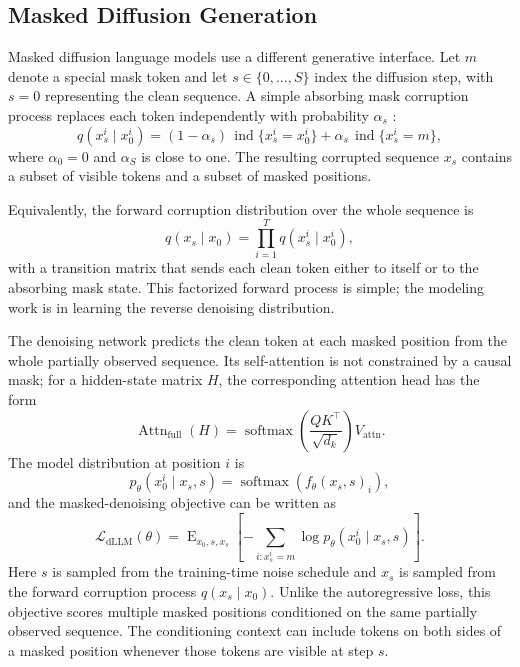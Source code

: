 \subsection{Masked Diffusion Generation}
Masked diffusion language models use a different generative interface. Let
$m$ denote a special mask token and let $s\in\{0,\ldots,S\}$ index the
diffusion step, with $s=0$ representing the clean sequence. A simple absorbing
mask corruption process replaces each token independently with probability
$\alpha_s$ \cite{austin2021structured,nie2025llada}:
\begin{equation}
    q(x_s^i \mid x_0^i)
    =
    (1-\alpha_s)\,\operatorname{ind}\{x_s^i=x_0^i\}
    +
    \alpha_s\,\operatorname{ind}\{x_s^i=m\},
\end{equation}
where $\alpha_0=0$ and $\alpha_S$ is close to one. The resulting corrupted
sequence $x_s$ contains a subset of visible tokens and a subset of masked
positions.

Equivalently, the forward corruption distribution over the whole sequence is
\begin{equation}
    q(x_s\mid x_0)
    =
    \prod_{i=1}^{T}q(x_s^i\mid x_0^i),
\end{equation}
with a transition matrix that sends each clean token either to itself or to the
absorbing mask state. This factorized forward process is simple; the modeling
work is in learning the reverse denoising distribution.

The denoising network predicts the clean token at each masked position from
the whole partially observed sequence. Its self-attention is not constrained by
a causal mask; for a hidden-state matrix $H$, the corresponding attention head
has the form
\begin{equation}
    \operatorname{Attn}_{\mathrm{full}}(H)
    =
    \operatorname{softmax}\!\left(\frac{QK^\top}{\sqrt{d_k}}\right)V_{\mathrm{attn}}.
\end{equation}
The model distribution at position $i$ is
\begin{equation}
    p_\theta(x_0^i \mid x_s,s)
    =
    \operatorname{softmax}(f_\theta(x_s,s)_i),
\end{equation}
and the masked-denoising objective can be written as
\begin{equation}
    \mathcal{L}_{\mathrm{dLLM}}(\theta)
    =
    \operatorname{E}_{x_0,s,x_s}
    \left[
    -\sum_{i:x_s^i=m}\log p_\theta(x_0^i\mid x_s,s)
    \right].
\end{equation}
Here \(s\) is sampled from the training-time noise schedule and \(x_s\) is
sampled from the forward corruption process \(q(x_s \mid x_0)\).
Unlike the autoregressive loss, this objective scores multiple masked positions
conditioned on the same partially observed sequence. The conditioning context
can include tokens on both sides of a masked position whenever those tokens are
visible at step $s$.


